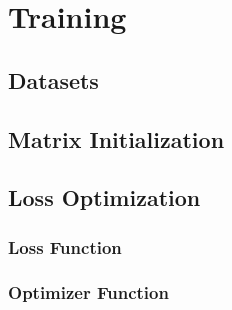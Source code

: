 \chapter{Training}

\section{Datasets}


\section{Matrix Initialization}

\section{Loss Optimization}

\subsection{Loss Function}

\subsection{Optimizer Function}
